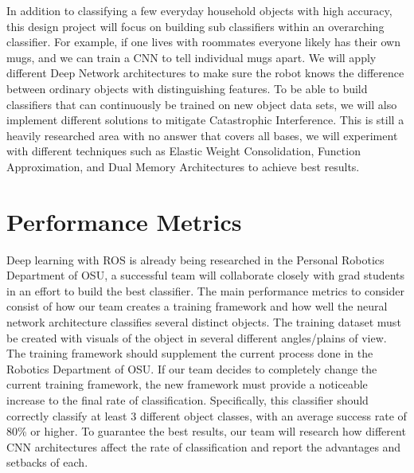 \documentclass[a4paper, 10pt]{article}
\begin{document}
In addition to classifying a few everyday household objects with high accuracy, this design project will focus on building sub classifiers within an overarching classifier. For example, if one lives with roommates everyone likely has their own mugs, and we can train a CNN to tell individual mugs apart. We will apply different Deep Network architectures to make sure the robot knows the difference between ordinary objects with distinguishing features. To be able to build classifiers that can continuously be trained on new object data sets, we will also implement different solutions to mitigate Catastrophic Interference. This is still a heavily researched area with no answer that covers all bases, we will experiment with different techniques such as Elastic Weight Consolidation, Function Approximation, and Dual Memory Architectures to achieve best results.

\section{Performance Metrics}
Deep learning with ROS is already being researched in the Personal Robotics Department of OSU, a successful team will collaborate closely with grad students in an effort to build the best classifier. The main performance metrics to consider consist of how our team creates a training framework and how well the neural network architecture classifies several distinct objects. The training dataset must be created with visuals of the object in several different angles/plains of view. The training framework should supplement the current process done in the Robotics Department of OSU. If our team decides to completely change the current training framework, the new framework must provide a noticeable increase to the final rate of classification. Specifically, this classifier should correctly classify at least 3 different object classes, with an average success rate of 80\% or higher. To guarantee the best results, our team will research how different CNN architectures affect the rate of classification and report the advantages and setbacks of each.
\end{document}
